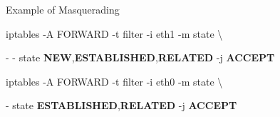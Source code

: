 \begin{frame}[t,allowframebreaks]{Example of Masquerading}
  \vspace{0.08cm}
  {\color{CommandGreen}\ttfamily\fontsize{13.5}{16.5}\selectfont iptables -A FORWARD -t filter -i eth1 -m state \textbackslash{}\par}
  - - state \textcolor{WarningColor}{\bfseries NEW},\textcolor{WarningColor}{\bfseries ESTABLISHED},\textcolor{WarningColor}{\bfseries RELATED} -j \textcolor{WarningColor}{\bfseries ACCEPT}\par
  \vspace{0.08cm}
  {\color{CommandGreen}\ttfamily\fontsize{13.5}{16.5}\selectfont iptables -A FORWARD -t filter -i eth0 -m state \textbackslash{}\par}
  - state \textcolor{WarningColor}{\bfseries ESTABLISHED},\textcolor{WarningColor}{\bfseries RELATED} -j \textcolor{WarningColor}{\bfseries ACCEPT}\par
\end{frame}
